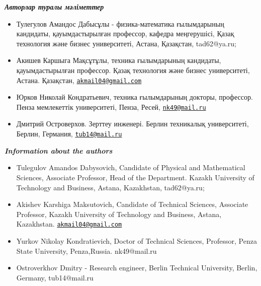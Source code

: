 \begin{center}
\emph{{\bfseries Авторлар туралы мәліметтер}}
\end{center}

\begin{itemize}
\item
Тулегулов Амандос Дабысұлы - физика-математика ғылымдарының кандидаты,
қауымдастырылған профессор, кафедра меңгерушісі, Қазақ технология және
бизнес университеті, Астана, Қазақстан, tad62@ya.ru;

\item
Акишев Каршыга Мақсұтұлы, техника ғылымдарының кандидаты,
қауымдастырылған профессор. Қазақ технология және бизнес университеті,
Астана. Қазақстан,
\href{mailto:akmail04@gmail.com}{\nolinkurl{akmail04@gmail.com}}

\item
Юрков Николай Кондратьевич, техника ғылымдарының докторы, профессор.
Пенза мемлекеттік университеті, Пенза, Ресей,
\href{mailto:nk49@mail.ru}{\nolinkurl{nk49@mail.ru}}

\item
Дмитрий Островерхов. Зерттеу инженері. Берлин техникалық университеті,
Берлин, Германия, \href{mailto:tub14@mail.ru}{\nolinkurl{tub14@mail.ru}}
\end{itemize}

\begin{center}
\emph{{\bfseries Information about the authors}}
\end{center}

\begin{itemize}
\item
Tulegulov Amandos Dabysovich, Candidate of Physical and Mathematical
Sciences, Associate Professor, Head of the Department. Kazakh University
of Technology and Business, Astana, Kazakhstan, tad62@ya.ru;

\item
Akishev Karshiga Maksutovich, Candidate of Technical Sciences, Associate
Professor, Kazakh University of Technology and Business, Astana,
Kazakhstan.
\href{mailto:akmail04@gmail.com}{\nolinkurl{akmail04@gmail.com}}

\item
Yurkov Nikolay Kondratievich, Doctor of Technical Sciences, Professor,
Penza State University, Penza,Russia. nk49@mail.ru

\item
Ostroverkhov Dmitry - Research engineer, Berlin Technical University,
Berlin, Germany, tub14@mail.ru
\end{itemize}
